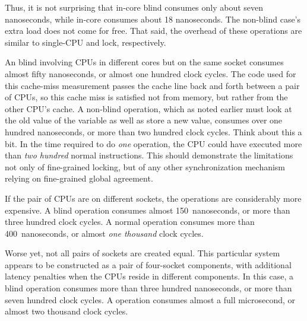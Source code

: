Thus, it is not surprising that in-core blind  consumes only about
seven nanoseconds, while in-core  consumes about 18 nanoseconds.
The non-blind case's extra load does not come for free.
That said, the overhead of these operations are similar to single-CPU
 and lock, respectively.

\QuickQuizEnd

An blind  involving CPUs in different cores but on the same socket
consumes almost fifty nanoseconds, or almost one hundred clock cycles.
The code used for this cache-miss measurement passes the cache line
back and forth between a pair of CPUs, so this cache miss is satisfied
not from memory, but rather from the other CPU's cache.
A non-blind  operation, which as noted earlier must look at the old
value of the variable as well as store a new value, consumes over one
hundred nanoseconds, or more than two hundred clock cycles.
Think about this a bit.
In the time required to do \emph{one}  operation, the CPU could have
executed more than \emph{two hundred} normal instructions.
This should demonstrate the limitations not only of fine-grained locking,
but of any other synchronization mechanism relying on fine-grained
global agreement.

If the pair of CPUs are on different sockets, the operations are considerably
more expensive.
A blind  operation consumes almost 150~nanoseconds, or more than
three hundred clock cycles.
A normal  operation consumes more than 400~nanoseconds, or almost
\emph{one thousand} clock cycles.

Worse yet, not all pairs of sockets are created equal.
This particular system appears to be constructed as a pair of four-socket
components, with additional latency penalties when the CPUs reside
in different components.
In this case, a blind  operation consumes more than three hundred
nanoseconds, or more than seven hundred clock cycles.
A  operation consumes almost a full microsecond, or almost two
thousand clock cycles.

